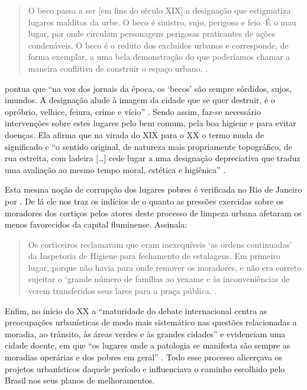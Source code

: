 \begin{refsection}
    \begin{quotation}
        O beco passa a ser [em fins do século XIX] a designação que estigmatiza lugares malditos da urbe. O beco é sinistro, sujo, perigoso e feio. É o mau lugar, por onde circulam personagens perigosas praticantes de ações condenáveis. O beco é o reduto dos excluídos urbanos e corresponde, de forma exemplar, a uma bela demonstração do que poderíamos chamar a maneira conflitiva de construir o espaço urbano. \cite[p.~115]{Pesavento2001EraUmaVez}.
    \end{quotation}

    \textcite{Pesavento2001EraUmaVez} pontua que ``na voz dos jornais da época, os `becos' são sempre sórdidos, sujos, imundos. A designação alude à imagem da cidade que se quer destruir, é o opróbrio, velhice, feiura, crime e vício'' \cite[p.~19]{Pesavento1999Lugares}. Sendo assim, faz-se necessário intervenções sobre estes lugares pelo bem comum, pela boa higiene e para evitar doenças. Ela afirma que na virada do XIX para o XX o termo muda de significado e ``o sentido original, de natureza mais propriamente topográfico, de rua estreita, com ladeira [\dots] cede lugar a uma designação depreciativa que traduz uma avaliação ao mesmo tempo moral, estética e higiênica'' \cite[p.~115]{Pesavento2001EraUmaVez}.

    Esta mesma noção de corrupção dos lugares pobres é verificada no Rio de Janeiro por \textcite{Chalhoub1996Cidade}. De lá ele nos traz os indícios de o quanto as pressões exercidas sobre os moradores dos cortiços pelos atores deste processo de limpeza urbana afetaram os menos favorecidos da capital fluminense. Assinala:  

    \begin{quotation}
        Os corticeiros reclamavam que eram inexequíveis `as ordens continuadas' da Inspetoria de Higiene para fechamento de estalagens. Em primeiro lugar, porque não havia para onde remover os moradores, e não era correto sujeitar o `grande número de famílias ao vexame e às inconveniências de verem transferidos seus lares para a praça pública. \cite[p.~49]{Chalhoub1996Cidade}.
    \end{quotation}


    Enfim, no início do XX a ``maturidade do debate internacional centra as preocupações urbanísticas de modo mais sistemático nas questões relacionadas a moradia, ao trânsito, às áreas verdes e às grandes cidades'' \cite[p.~32]{Bresciani2010Sanitarismo} e evidenciam uma cidade doente, em que ``os lugares onde a patologia se manifesta são sempre as moradias operárias e dos pobres em geral'' \cite[p.~32]{Bresciani2010Sanitarismo}. Todo esse processo alicerçava os projetos urbanísticos daquele período e influenciava o caminho escolhido pelo Brasil nos seus planos de melhoramentos.


\end{refsection}
